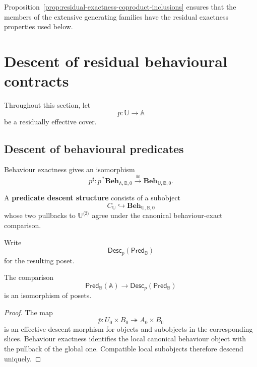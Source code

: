 Proposition~\ref{prop:residual-exactness-coproduct-inclusions} ensures that
the members of the extensive generating families have the residual exactness
properties used below.

\section{Descent of residual behavioural contracts}
\label{sec:descent-residual-behavioural-contracts}

Throughout this section, let
\[
    p:\mathbb U\to\mathbb A
\]
be a residually effective cover.

\subsection{Descent of behavioural predicates}
\label{subsec:descent-behavioural-predicates-rigorous}

Behaviour exactness gives an isomorphism
\[
    p^\sharp:
    \overline p^{\,\ast}
    \mathbf{Beh}_{\mathbb A,\mathbb B,0}
    \xrightarrow{\cong}
    \mathbf{Beh}_{\mathbb U,\mathbb B,0}.
\]

\begin{definition}
\label{def:predicate-descent-datum}
A \textbf{predicate descent structure} consists of a subobject
\[
    C_{\mathbb U}
    \hookrightarrow
    \mathbf{Beh}_{\mathbb U,\mathbb B,0}
\]
whose two pullbacks to
\(\mathbb U^{\langle2\rangle}\) agree under the canonical behaviour-exact
comparison.
\end{definition}

Write
\[
    \mathsf{Desc}_p
    \left(
        \mathsf{Pred}_{\mathbb B}
    \right)
\]
for the resulting poset.

\begin{proposition}
\label{prop:descent-behavioural-predicates-rigorous}
The comparison
\[
    \mathsf{Pred}_{\mathbb B}(\mathbb A)
    \longrightarrow
    \mathsf{Desc}_p
    \left(
        \mathsf{Pred}_{\mathbb B}
    \right)
\]
is an isomorphism of posets.
\end{proposition}

\begin{proof}
The map
\[
    \overline p:
    U_0\times B_0
    \twoheadrightarrow
    A_0\times B_0
\]
is an effective descent morphism for objects and subobjects in the
corresponding slices. Behaviour exactness identifies the local canonical
behaviour object with the pullback of the global one. Compatible local
subobjects therefore descend uniquely.
\end{proof}

